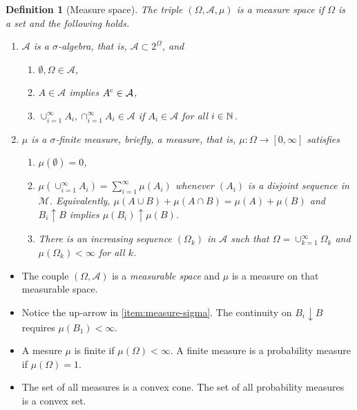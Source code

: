 \documentclass[12pt,a4paper]{amsart}
\theoremstyle{plain}
\newtheorem{definition}[theorem]{Definition}%
\theoremstyle{definition}
\theoremstyle{remark}
\begin{document}
\begin{definition}[Measure space]
The triple $(\Omega,\mathcal A,\mu)$ is a \emph{measure space} if
$\Omega$ is a set and the following holds.
\begin{enumerate}
\item $\mathcal A$ is a \emph{$\sigma$-algebra}, that is, $\mathcal A
  \subset 2^\Omega$, and
  \begin{enumerate}
  \item $\emptyset, \Omega \in \mathcal A$,
  \item $A \in \mathcal A$ implies $A^{\text c} \in \mathcal A$,
  \item
    $\cup_{i=1}^{\infty} A_i, \cap_{i=1}^{\infty} A_i \in \mathcal A$
    if $A_i \in \mathcal A$ for all $i \in \mathbb{N}$.
  \end{enumerate}
  \item $\mu$ is a \emph{$\sigma$-finite measure}, briefly, a
    \emph{measure}, that is, $\mu \colon \Omega \to [0,\infty]$ satisfies
  \begin{enumerate} 
  \item $\mu(\emptyset) = 0$,
  \item \label{item:measure-sigma}
    $\mu\left(\cup_{i=1 }^\infty A_i\right) = \sum_{i=1}^\infty
    \mu(A_i)$ whenever $(A_i)$ is a disjoint sequence in $\mathcal
    M$. Equivalently,
    $\mu(A \cup B) + \mu(A \cap B) = \mu(A) + \mu(B)$ and
    $B_i \uparrow B$ implies $\mu(B_i) \uparrow \mu(B)$.
  \item There is an increasing sequence $(\Omega_k)$ in $\mathcal A$
    such that $\Omega = \cup_{k=1}^\infty \Omega_k$ and
    $\mu(\Omega_k) < \infty$ for all $k$.
  \end{enumerate}
\end{enumerate}
\end{definition}

\begin{itemize}
\item The couple $(\Omega,\mathcal A)$ is a \emph{measurable space} and
$\mu$ is a measure on that measurable space. 
\item  Notice the up-arrow in
\cref{item:measure-sigma}. The continuity on $B_i \downarrow B$
requires $\mu(B_1) < \infty$. 
\item  A mesure $\mu$ is finite if
$\mu(\Omega) < \infty$. A finite measure is a probability measure if
$\mu(\Omega) =1$.
\item  The set of all measures is a convex cone. The set of
all probability measures is a convex set.
\end{itemize}
\end{document}
